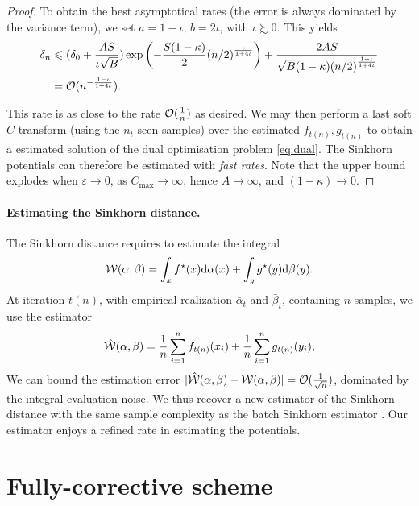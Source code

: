 \begin{proof}
To obtain the best asymptotical rates (the error is always dominated by the variance term), we set $a = 1 - \iota$, $ b = 2 \iota$, with $\iota \succsim 0$. This yields
\begin{align}
    \delta_n &\leqslant 
    (\delta_0 + \frac{A S}{\iota \sqrt{B}})
    \exp\left(- \frac{S(1 - \kappa)}{2} {(n/2)}^{\frac{\iota}{1 + 4\iota}}\right)
    + \frac{2 A S}{\sqrt{B}(1 - \kappa) {(n/2)}^{\frac{1 - \iota}{1 + 4\iota}}} \\
    &= \mathcal{O}(n^{-\frac{1 - \iota}{1 + 4 \iota}}).
\end{align}

This rate is as close to the rate $\mathcal{O}(\frac{1}{n})$ as desired. We may then
perform a last soft $C$-transform (using the $n_t$ seen samples) over the
estimated $f_{t(n)}, g_{t(n)}$ to obtain a estimated solution of the dual
optimisation problem \eqref{eq:dual}. The Sinkhorn potentials can therefore be
estimated with \textit{fast rates}. Note that the upper bound explodes when $\varepsilon
\to 0$, as $C_{\max} \to \infty$, hence $A \to \infty$, and $(1 - \kappa) \to 0$.
\end{proof}

\paragraph{Estimating the Sinkhorn distance.} The Sinkhorn distance requires to estimate the integral
\begin{equation}
    \mathcal{W}(\alpha, \beta) = \int_x f^\star(x) \textrm{d} \alpha(x) + \int_y g^\star(y) \textrm{d} \beta(y).
\end{equation}
At iteration $t(n)$, with empirical realization $\bar \alpha_t$ and $\bar
\beta_t$, containing $n$ samples, we use the estimator
\begin{equation}
    \hat {\mathcal{W}}(\alpha, \beta) = \frac{1}{n} \sum_{i=1}^n f_{t(n)}(x_i) + \frac{1}{n} \sum_{i=1}^n g_{t(n)}(y_i),
\end{equation}
We can bound the estimation error $|\hat {\mathcal{W}}(\alpha, \beta) - \mathcal{W}(\alpha, \beta) | =
\mathcal{O}(\frac{1}{\sqrt{n}})$, dominated by the integral evaluation noise. We thus recover
a new estimator of the Sinkhorn distance with the same sample complexity as the
batch Sinkhorn estimator \citep{2019-Genevay-aistats}. Our estimator enjoys a
refined rate in estimating the potentials.

\section{Fully-corrective scheme}\label{app:fully_corrective}

